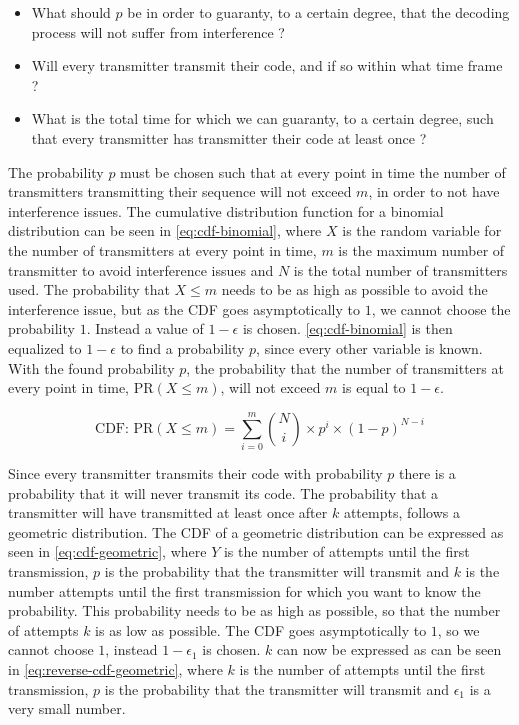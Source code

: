 \begin{itemize}
	\item What should $p$ be in order to guaranty, to a certain degree, that the decoding process will not suffer from interference ?
	\item Will every transmitter transmit their code, and if so within what time frame ?
	\item What is the total time for which we can guaranty, to a certain degree, such that every transmitter has transmitter their code at least once ? 
\end{itemize}



The probability $p$ must be chosen such that at every point in time the number of transmitters transmitting their sequence will not exceed $m$, in order to not have interference issues.
The cumulative distribution function for a binomial distribution can be seen in \autoref{eq:cdf-binomial}, where $X$ is the random variable for the number of transmitters at every point in time, $m$ is the maximum number of transmitter to avoid interference issues and $N$ is the total number of transmitters used.
The probability that $X \le m$ needs to be as high as possible to avoid the interference issue, but as the CDF goes asymptotically to $1$, we cannot choose the probability $1$.
Instead a value of $1 - \epsilon$ is chosen.
\autoref{eq:cdf-binomial} is then equalized to $1 - \epsilon$ to find a probability $p$, since every other variable is known.
With the found probability $p$, the probability that the number of transmitters at every point in time, PR$(X \le m)$, will not exceed $m$ is equal to $1 - \epsilon$.

\begin{equation}
	\label{eq:cdf-binomial}
	\text{CDF:  PR}(X \le m) = \displaystyle\sum_{i=0}^{m} \binom Ni \times p^i \times (1 - p)^{N-i}
\end{equation}




Since every transmitter transmits their code with probability $p$ there is a probability that it will never transmit its code.
The probability that a transmitter will have transmitted at least once after $k$ attempts, follows a geometric distribution.
The CDF of a geometric distribution can be expressed as seen in \autoref{eq:cdf-geometric}, where $Y$ is the number of attempts until the first transmission, $p$ is the probability that the transmitter will transmit and $k$ is the number attempts until the first transmission for which you want to know the probability.
This probability needs to be as high as possible, so that the number of attempts $k$ is as low as possible.
The CDF goes asymptotically to $1$, so we cannot choose $1$, instead $1 - \epsilon_1$ is chosen.
$k$ can now be expressed as can be seen in \autoref{eq:reverse-cdf-geometric}, where $k$ is the number of attempts until the first transmission, $p$ is the probability that the transmitter will transmit and $\epsilon_1$ is a very small number.

